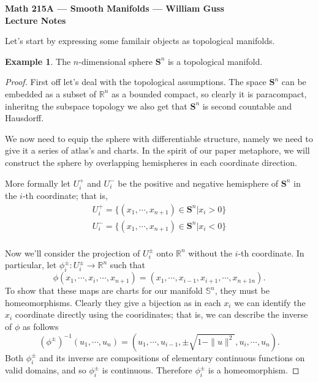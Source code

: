 \documentclass[11pt]{amsart}
\theoremstyle{definition}
\newtheorem{example}[definition]{Example}
\def\sphere{{\pmb S}}
\begin{document}
\begin{center}{\bf Math 215A --- Smooth Manifolds --- William Guss}
\\
{\bf Lecture Notes}
\end{center}

Let's start by expressing some familair objects as topological manifolds.
\begin{example}
	The $n$-dimensional sphere $\sphere^n$ is a topological manifold.
\end{example}
\begin{proof}
	First off let's deal with the topological assumptions. The space $\sphere^n$ can be embedded as a subset of $\mathbb{R}^n$ as a bounded compact, so clearly it is paracompact, inheritng the subspace topology we also get that $\sphere^n$ is second countable and Hausdorff. 

	We now need to equip the sphere with differentiable structure, namely we need to give it a series of atlas's and charts. In the spirit of our
	paper metaphore, we will construct the sphere by overlapping hemispheres in each coordinate direction. 

	More formally let $U_i^+$ and $U^-_i$ be the positive and negative hemisphere of $\sphere^n$ in the $i$-th coordinate; that is,
	\begin{equation*}
	\begin{aligned}
		U^+_i = \{(x_1, \cdots, x_{n+1})\in \sphere^n\mathrel{}\big|\mathrel{} x_i > 0\} \\
		U^-_i = \{(x_1, \cdots, x_{n+1})\in \sphere^n\mathrel{}\big|\mathrel{} x_i < 0\} \\
	\end{aligned}
	\end{equation*}


	Now we'll consider the projection of $U_i^\pm$ onto $\mathbb{R}^n$ without the $i$-th coordinate. In particular, let $\phi_i^{\pm}: U_i^{\pm} \to \mathbb{R}^n$ such that 
	\begin{equation*}
		\phi(x_1, \cdots, x_i, \cdots, x_{n+1}) = (x_1, \cdots, x_{i-1}, x_{i+1}, \cdots, x_{n+1n}).
	\end{equation*}
	To show that these maps are charts for our manifold $\mathbb{S}^n$, they must be homeomorphisms. Clearly they give a bijection as in each $x_i$ we can identify the $x_i$ coordinate directly using the cooridinates; that is, we can describe the inverse of $\phi$ as follows
	\begin{equation*}
		(\phi^{\pm})^{-1}(u_1, \cdots, u_n) = \left( u_1, \cdots, u_{i-1}, \pm \sqrt{1 - \|u\|^2}, u_i, \cdots, u_n\right).
	\end{equation*}
	Both $\phi_i^{\pm}$ and its inverse are compositions of elementary continuous functions on valid domains, and so $\phi_i^\pm$ is continuous.  Therefore $\phi_i^{\pm}$ is a homeomorphism.


\end{proof}
\end{document}
